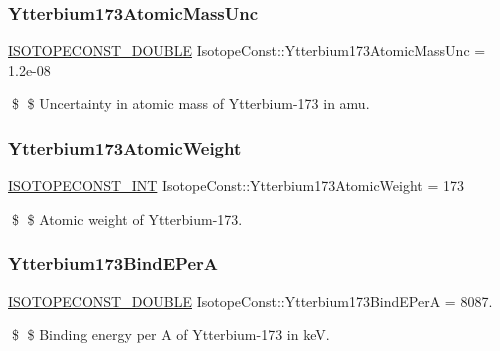 \subsubsection{\texorpdfstring{Ytterbium173\+Atomic\+Mass\+Unc}{Ytterbium173AtomicMassUnc}}
{\footnotesize\ttfamily \mbox{\hyperlink{group___isotope_const-_macros_ga8f45a7272ce02c0b4c65c44636ed719a}{I\+S\+O\+T\+O\+P\+E\+C\+O\+N\+S\+T\+\_\+\+D\+O\+U\+B\+LE}} Isotope\+Const\+::\+Ytterbium173\+Atomic\+Mass\+Unc = 1.\+2e-\/08}

\$ \$ Uncertainty in atomic mass of Ytterbium-\/173 in amu. \mbox{\label{group___isotope_const-_ytterbium-_yb173_ga56c6c3d031fa89ebd99568e9afbe7280}} 
\subsubsection{\texorpdfstring{Ytterbium173\+Atomic\+Weight}{Ytterbium173AtomicWeight}}
{\footnotesize\ttfamily \mbox{\hyperlink{group___isotope_const-_macros_ga5f18360b3e99483a35c32d789e62621c}{I\+S\+O\+T\+O\+P\+E\+C\+O\+N\+S\+T\+\_\+\+I\+NT}} Isotope\+Const\+::\+Ytterbium173\+Atomic\+Weight = 173}

\$ \$ Atomic weight of Ytterbium-\/173. \mbox{\label{group___isotope_const-_ytterbium-_yb173_ga53801796e032cfe5e08c210921eb2b8c}} 
\subsubsection{\texorpdfstring{Ytterbium173\+Bind\+E\+PerA}{Ytterbium173BindEPerA}}
{\footnotesize\ttfamily \mbox{\hyperlink{group___isotope_const-_macros_ga8f45a7272ce02c0b4c65c44636ed719a}{I\+S\+O\+T\+O\+P\+E\+C\+O\+N\+S\+T\+\_\+\+D\+O\+U\+B\+LE}} Isotope\+Const\+::\+Ytterbium173\+Bind\+E\+PerA = 8087.}

\$ \$ Binding energy per A of Ytterbium-\/173 in keV. \mbox{\label{group___isotope_const-_ytterbium-_yb173_gab1eae946f7ce210f0cb4a15890cfadf8}} 
